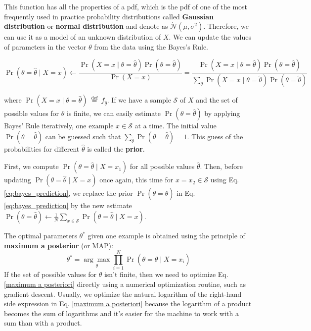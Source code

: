 This function has all the properties of a pdf, which is the pdf of one of the most frequently used in practice probability distributions called \textbf{Gaussian distribution} or \textbf{normal distribution} and denote as \(\dot{\mathcal{N}}\left(\mu, \sigma^{2}\right)\). Therefore, we can use it as a model of an unknown distribution of \(X\). We can update the values of parameters in the vector \(\theta\) from the data using the Bayes's Rule.

\begin{equation}
	\operatorname{Pr}(\theta=\hat{\theta} \mid X=x) \leftarrow \frac{\operatorname{Pr}(X=x \mid \theta=\hat{\theta}) \operatorname{Pr}(\theta=\hat{\theta})}{\operatorname{Pr}(X=x)}=\frac{\operatorname{Pr}(X=x \mid \theta=\hat{\theta}) \operatorname{Pr}(\theta=\hat{\theta})}{\sum_{\tilde{\theta}} \operatorname{Pr}(X=x \mid \theta=\tilde{\theta}) \operatorname{Pr}(\theta=\tilde{\theta})}
	\label{eq:bayes_prediction}
\end{equation}

where \(\operatorname{Pr}(X=x \mid \theta=\hat{\theta}) \stackrel{\text { def }}{=} f_{\hat{\theta}}\). If we have a sample \(\mathcal{S}\) of \(X\) and the set of possible values for \(\theta\) is finite, we can easily estimate \(\operatorname{Pr}(\theta=\hat{\theta})\) by applying Bayes' Rule iteratively, one example \(x \in \mathcal{S}\) at a time. The initial value \(\operatorname{Pr}(\theta=\hat{\theta})\) can be guessed such that \(\sum_{\hat{\theta}} \operatorname{Pr}(\theta=\hat{\theta})=1\). This guess of the probabilities for different \(\hat{\theta}\) is called the \textbf{prior}.

First, we compute \(\operatorname{Pr}\left(\theta=\hat{\theta} \mid X=x_{1}\right)\) for all possible values \(\hat{\theta}\). Then, before updating \(\operatorname{Pr}(\theta=\hat{\theta} \mid X=x)\) once again, this time for \(x=x_{2} \in \mathcal{S}\) using Eq.\ref{eq:bayes_prediction}, we replace the prior \(\operatorname{Pr}(\theta=\hat{\theta})\) in Eq.\ref{eq:bayes_prediction} by the new estimate \(\operatorname{Pr}(\theta=\hat{\theta}) \leftarrow \frac{1}{N} \sum_{x \in \mathcal{S}} \operatorname{Pr}(\theta=\hat{\theta} \mid X=x)\).

The optimal parameters \(\theta^{*}\) given one example is obtained using the principle of \textbf{maximum a posterior} (or MAP):
\begin{equation}
	\theta^{*}=\underset{\theta}{\arg \max } \prod_{i=1}^{N} \operatorname{Pr}\left(\theta=\hat{\theta} \mid X=x_{i}\right)
	\label{maximum a posteriori}
\end{equation}
If the set of possible values for $\theta$ isn't finite, then we need to optimize Eq. \ref{maximum a posteriori} directly using a numerical optimization routine, such as gradient descent.  Usually, we optimize the natural logarithm of the right-hand  side expression in Eq. \ref{maximum a posteriori} because the logarithm of a product becomes the sum of logarithms and it's easier for the machine to work with a sum than with a product.

